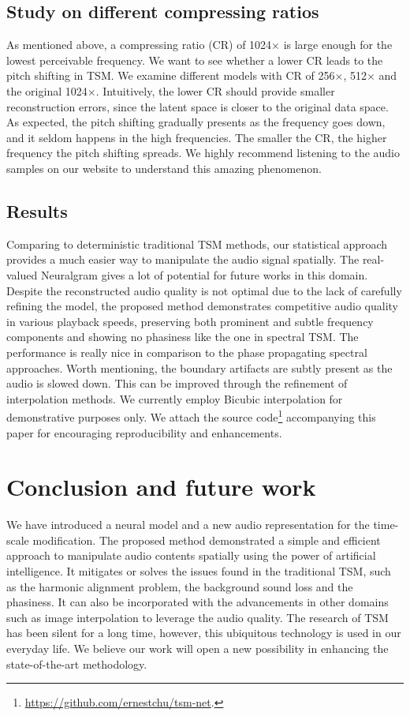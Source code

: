 \documentclass[12pt]{article}
\begin{document}
\subsection{Study on different compressing ratios}
As mentioned above, a compressing ratio (CR) of 1024$\times$ is large enough for the lowest perceivable frequency. We want to see whether a lower CR leads to the pitch shifting in TSM. We examine different models with CR of 256$\times$, 512$\times$ and the original 1024$\times$. Intuitively, the lower CR should provide smaller reconstruction errors, since the latent space is closer to the original data space. As expected, the pitch shifting gradually presents as the frequency goes down, and it seldom happens in the high frequencies. The smaller the CR, the higher frequency the pitch shifting spreads. We highly recommend listening to the audio samples on our website to understand this amazing phenomenon.

\subsection{Results}
Comparing to deterministic traditional TSM methods, our statistical approach provides a much easier way to manipulate the audio signal spatially. The real-valued Neuralgram gives a lot of potential for future works in this domain. Despite the reconstructed audio quality is not optimal due to the lack of carefully refining the model, the proposed method demonstrates competitive audio quality in various playback speeds, preserving both prominent and subtle frequency components and showing no phasiness like the one in spectral TSM. The performance is really nice in comparison to the phase propagating spectral approaches. Worth mentioning, the boundary artifacts are subtly present as the audio is slowed down. This can be improved through the refinement of interpolation methods. We currently employ Bicubic \cite{key81} interpolation for demonstrative purposes only. We attach the source code\footnote{\url{https://github.com/ernestchu/tsm-net}.} accompanying this paper for encouraging reproducibility and enhancements.

\section{Conclusion and future work}
We have introduced a neural model and a new audio representation for the time-scale modification. The proposed method demonstrated a simple and efficient approach to manipulate audio contents spatially using the power of artificial intelligence. It mitigates or solves the issues found in the traditional TSM, such as the harmonic alignment problem, the background sound loss and the phasiness. It can also be incorporated with the advancements in other domains such as image interpolation to leverage the audio quality. The research of TSM has been silent for a long time, however, this ubiquitous technology is used in our everyday life. We believe our work will open a new possibility in enhancing the state-of-the-art methodology.
\end{document}
